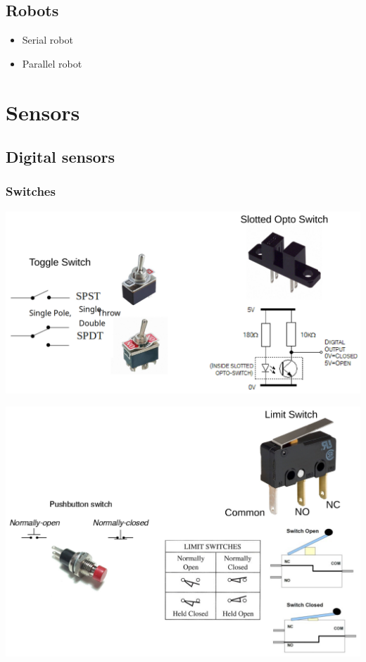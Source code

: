 \documentclass[11pt]{article}
\begin{document}
\subsection{Robots}
\label{sec:org1acd0b2}
\begin{itemize}
\item Serial robot
\item Parallel robot
\end{itemize}

\section{Sensors}
\label{sec:org51c672f}

\subsection{Digital sensors}
\label{sec:org89d5e29}

\subsubsection{Switches}
\label{sec:orgd71d121}
\begin{center}
\includegraphics[width=.9\linewidth]{./images/toggle-and-slotted-opto-switches.png}
\end{center}
\begin{center}
\includegraphics[width=.9\linewidth]{./images/pushbutton-and-limit-switches.png}
\end{center}
\end{document}
